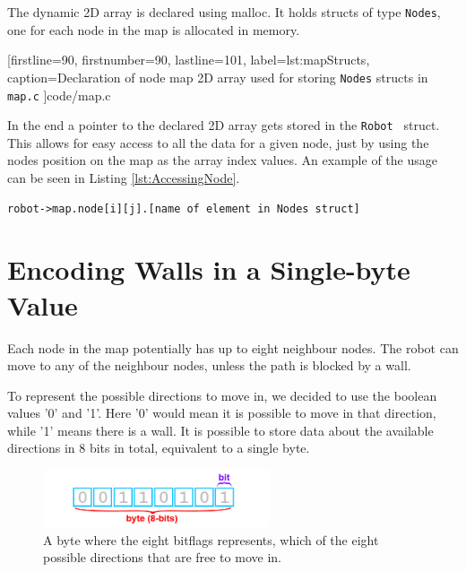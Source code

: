 The dynamic 2D array is declared using malloc. 
It holds structs of type {\tt Nodes}, one for each node in the map is allocated in memory.


[firstline=90,			%
firstnumber=90,		%
lastline=101,			%
label=lst:mapStructs,	%
caption={Declaration of node map 2D array used for storing {\tt Nodes} structs in {\tt map.c}}
]{code/map.c}

In the end a pointer to the declared 2D array gets stored in the {\tt Robot } struct.
This allows for easy access to all the data for a given node, just by using the nodes position on the map as the array index values. An example of the usage can be seen in Listing \ref{lst:AccessingNode}. 

\begin{lstlisting}[caption={Example of accessing a node in the node map stored in a 2D array in {\tt map.c}},label={lst:AccessingNode}]
robot->map.node[i][j].[name of element in Nodes struct]
\end{lstlisting}

\section{Encoding Walls in a Single-byte Value}
\label{sec:map_hex}
Each node in the map potentially has up to eight neighbour nodes. 
The robot can move to any of the neighbour nodes, unless the path is blocked by a wall.

To represent the possible directions to move in, we decided to use the boolean values '0' and '1'. 
Here '0' would mean it is possible to move in that direction, while '1' means there is a wall.
It is possible to store data about the available directions in 8 bits in total, equivalent to a single byte.

\begin{figure}[htp]
    \centering
        \includegraphics[width=0.60\textwidth]{figures/map/bitbyte.png}%
    \caption{A byte where the eight bitflags represents, which of the eight possible directions that are free to move in.}
    \label{fig:bitbyte}
\end{figure}

